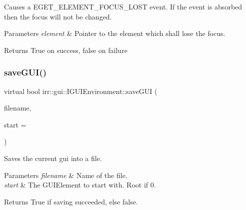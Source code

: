 Causes a E\+G\+E\+T\+\_\+\+E\+L\+E\+M\+E\+N\+T\+\_\+\+F\+O\+C\+U\+S\+\_\+\+L\+O\+ST event. If the event is absorbed then the focus will not be changed. 
\begin{DoxyParams}{Parameters}
{\em element} & Pointer to the element which shall lose the focus. \\
\hline
\end{DoxyParams}
\begin{DoxyReturn}{Returns}
True on success, false on failure 
\end{DoxyReturn}
\mbox{\label{classirr_1_1gui_1_1IGUIEnvironment_ac5e7b39ff2292983660a5e5999b240b3}} 
\subsubsection{\texorpdfstring{save\+G\+U\+I()}{saveGUI()}\hspace{0.1cm}{\footnotesize\ttfamily [1/2]}}
{\footnotesize\ttfamily virtual bool irr\+::gui\+::\+I\+G\+U\+I\+Environment\+::save\+G\+UI (\begin{DoxyParamCaption}\item[{const \hyperlink{namespaceirr_1_1io_ab1bdc45edb3f94d8319c02bc0f840ee1}{io\+::path} \&}]{filename,  }\item[{\hyperlink{classirr_1_1gui_1_1IGUIElement}{I\+G\+U\+I\+Element} $\ast$}]{start = {} }\end{DoxyParamCaption})\hspace{0.3cm}{\ttfamily [pure virtual]}}



Saves the current gui into a file. 


\begin{DoxyParams}{Parameters}
{\em filename} & Name of the file. \\
\hline
{\em start} & The G\+U\+I\+Element to start with. Root if 0. \\
\hline
\end{DoxyParams}
\begin{DoxyReturn}{Returns}
True if saving succeeded, else false. 
\end{DoxyReturn}
\mbox{\label{classirr_1_1gui_1_1IGUIEnvironment_a39fdeef8455813a2be2bce9212ec758a}} 

